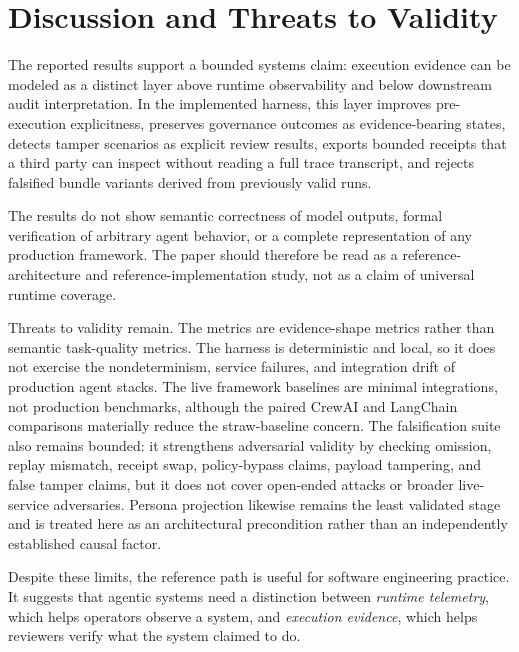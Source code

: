 \section{Discussion and Threats to Validity}
\label{sec:discussion}

The reported results support a bounded systems claim: execution evidence can be modeled as a distinct layer above runtime observability and below downstream audit interpretation. In the implemented harness, this layer improves pre-execution explicitness, preserves governance outcomes as evidence-bearing states, detects tamper scenarios as explicit review results, exports bounded receipts that a third party can inspect without reading a full trace transcript, and rejects falsified bundle variants derived from previously valid runs.

The results do not show semantic correctness of model outputs, formal verification of arbitrary agent behavior, or a complete representation of any production framework. The paper should therefore be read as a reference-architecture and reference-implementation study, not as a claim of universal runtime coverage.

Threats to validity remain. The metrics are evidence-shape metrics rather than semantic task-quality metrics. The harness is deterministic and local, so it does not exercise the nondeterminism, service failures, and integration drift of production agent stacks. The live framework baselines are minimal integrations, not production benchmarks, although the paired CrewAI and LangChain comparisons materially reduce the straw-baseline concern. The falsification suite also remains bounded: it strengthens adversarial validity by checking omission, replay mismatch, receipt swap, policy-bypass claims, payload tampering, and false tamper claims, but it does not cover open-ended attacks or broader live-service adversaries. Persona projection likewise remains the least validated stage and is treated here as an architectural precondition rather than an independently established causal factor.

Despite these limits, the reference path is useful for software engineering practice. It suggests that agentic systems need a distinction between \emph{runtime telemetry}, which helps operators observe a system, and \emph{execution evidence}, which helps reviewers verify what the system claimed to do.
